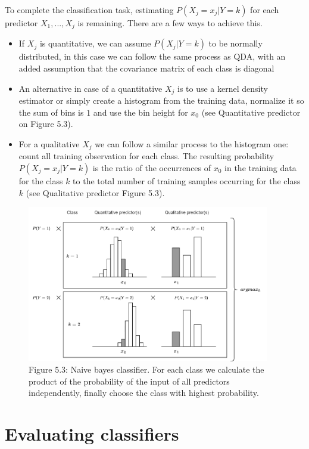 To complete the classification task, estimating \(P(X_j = x_j|Y=k)\) for each predictor \(X_1, ..., X_j\) is remaining. There are a few ways to achieve this.

\begin{itemize}
    \item If \(X_j\) is quantitative, we can assume \(P(X_j|Y = k)\) to be normally distributed, in this case we can follow the same process as QDA, with an added assumption that the covariance matrix of each class is diagonal
    \item An alternative in case of a quantitative \(X_j\) is to use a kernel density estimator or simply create a histogram from the training data, normalize it so the sum of bins is \(1\) and use the bin height for \(x_0\) (see Quantitative predictor on Figure 5.3).
    \item For a qualitative \(X_j\) we can follow a similar process to the histogram one: count all training observation for each class. The resulting probability \(P(X_j = x_j|Y=k)\) is the ratio of the occurrences of \(x_0\) in the training data for the class \(k\) to the total number of training samples occurring for the class \(k\) (see Qualitative predictor Figure 5.3).
\end{itemize}


\begin{figure}[htbp]
    \begin{center}
        \includegraphics[width=300pt]{../img/05-naive-bayes.png}
        \caption{Figure 5.3:  Naive bayes classifier. For each class we calculate the product of the probability of the input of all predictors independently, finally choose the class with highest probability.}
    \end{center}
\end{figure}


\section{Evaluating classifiers}

